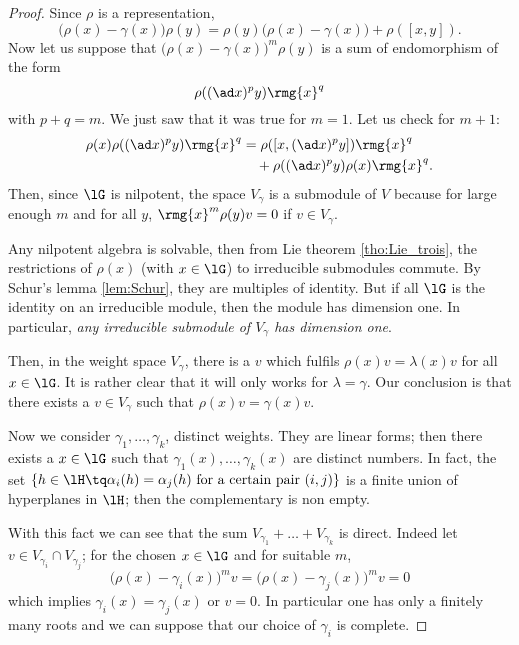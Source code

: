 \begin{proof}
Since $\rho$ is a representation,
\[
\big(\rho(x)-\gamma(x)\big)\rho(y)=\rho(y)\big( \rho(x)-\gamma(x) \big)+\rho([x,y]).
\]
Now let us suppose that $\big(\rho(x)-\gamma(x)\big)^m\rho(y)$ is a sum of endomorphism of the form 
\[
\rho( (\ad x)^py )\rmg{x}^q
\]
with $p+q=m$. We just saw that it was true for $m=1$. Let us check for $m+1$:
\begin{equation}
\begin{split}
\rho(x)\rho( (\ad x)^py )\rmg{x}^q&=\rho( [x,(\ad x)^py] )\rmg{x}^q\\
&\quad+\rho((\ad x)^py)\rho(x)\rmg{x}^q.
\end{split}
\end{equation}
Then, since $\lG$ is nilpotent, the space $V_{\gamma}$ is a submodule of $V$ because for large enough $m$ and for all $y$, $\rmg{x}^m \rho(y)v=0$ if $v\in V_{\gamma}$.

Any nilpotent algebra is solvable, then from Lie theorem \ref{tho:Lie_trois}, the restrictions of $\rho(x)$ (with $x\in\lG$) to irreducible submodules commute. By Schur's lemma \ref{lem:Schur}, they are multiples of identity. But if all $\lG$ is the identity on an irreducible module, then the module has dimension one. In particular, \emph{any irreducible submodule of $V_{\gamma}$ has dimension one}.

Then, in the weight space $V_{\gamma}$, there is a $v$ which fulfils  $\rho(x)v=\lambda(x)v$ for all $x\in\lG$. It is rather clear that it will only works for $\lambda=\gamma$. Our conclusion is that there exists a $v\in V_{\gamma}$ such that $\rho(x)v=\gamma(x)v$.

Now we consider $\gamma_1,\ldots,\gamma_k$, distinct weights. They are linear forms; then there exists a $x\in\lG$ such that $\gamma_1(x),\ldots,\gamma_k(x)$ are distinct numbers. In fact, the set $\{h\in\lH\tq \alpha_i(h)=\alpha_j(h)\text{ for a certain pair $(i,j)$}\}$ is a finite union of hyperplanes in $\lH$; then the complementary is non empty.


With this fact we can see that the sum $V_{\gamma_1}+\ldots+V_{\gamma_k}$ is direct. Indeed let $v\in V_{\gamma_i}\cap V_{\gamma_j}$; for the chosen $x\in\lG$ and for suitable $m$,
\begin{equation}
\big(  \rho(x)-\gamma_i(x) \big)^mv=\big(  \rho(x)-\gamma_j(x) \big)^mv=0
\end{equation}
which implies $\gamma_i(x)=\gamma_j(x)$ or $v=0$. In particular one has only a finitely many roots and we can suppose that our choice of $\gamma_i$ is complete.


\end{proof}
